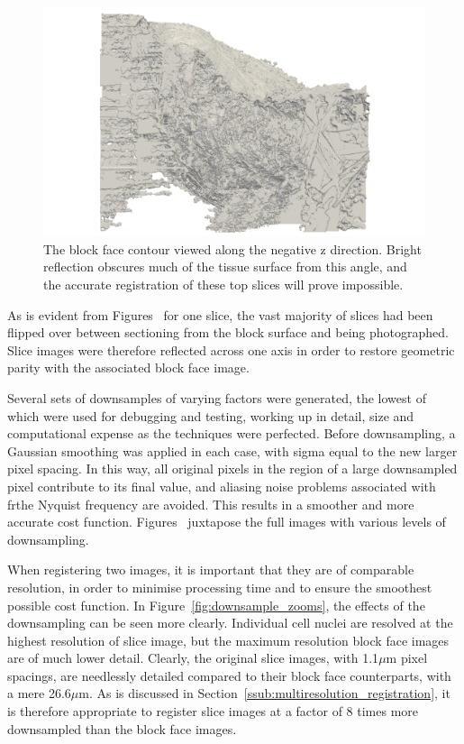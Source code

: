     \begin{figure}
      \centering
      \includegraphics[width=\textheight]{Ch5/Figs/Rat28/contours/LoRes_negative_z}
      \caption{The block face contour viewed along the negative z direction. Bright reflection obscures much of the tissue surface from this angle, and the accurate registration of these top slices will prove impossible.}
      \label{fig:LoRes_negative_z}
    \end{figure}
    
	As is evident from Figures~ for one slice, the vast majority of slices had been flipped over between sectioning from the block surface and being photographed. Slice images were therefore reflected across one axis in order to restore geometric parity with the associated block face image.
	
	 Several sets of downsamples of varying factors were generated, the lowest of which were used for debugging and testing, working up in detail, size and computational expense as the techniques were perfected. Before downsampling, a Gaussian smoothing was applied in each case, with sigma equal to the new larger pixel spacing. In this way, all original pixels in the region of a large downsampled pixel contribute to its final value, and aliasing noise problems associated with frthe Nyquist frequency are avoided. This results in a smoother and more accurate cost function. Figures~ juxtapose the full images with various levels of downsampling.
	 
	 When registering two images, it is important that they are of comparable resolution, in order to minimise processing time and to ensure the smoothest possible cost function. In Figure~\ref{fig:downsample_zooms}, the effects of the downsampling can be seen more clearly. Individual cell nuclei are resolved at the highest resolution of slice image, but the maximum resolution block face images are of much lower detail. Clearly, the original slice images, with 1.1$\mu$m pixel spacings, are needlessly detailed compared to their block face counterparts, with a mere 26.6$\mu$m. As is discussed in Section~\ref{ssub:multiresolution_registration}, it is therefore appropriate to register slice images at a factor of 8 times more downsampled than the block face images.
    
